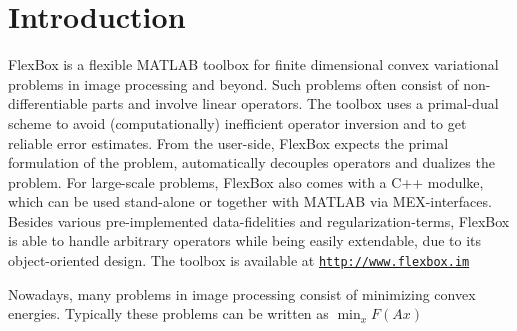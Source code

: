 \hypertarget{index_intro_sec}{}\section{Introduction}\label{index_intro_sec}
Flex\+Box is a flexible M\+A\+T\+L\+AB toolbox for finite dimensional convex variational problems in image processing and beyond. Such problems often consist of non-\/differentiable parts and involve linear operators. The toolbox uses a primal-\/dual scheme to avoid (computationally) inefficient operator inversion and to get reliable error estimates. From the user-\/side, Flex\+Box expects the primal formulation of the problem, automatically decouples operators and dualizes the problem. For large-\/scale problems, Flex\+Box also comes with a C++ modulke, which can be used stand-\/alone or together with M\+A\+T\+L\+AB via M\+E\+X-\/interfaces. Besides various pre-\/implemented data-\/fidelities and regularization-\/terms, Flex\+Box is able to handle arbitrary operators while being easily extendable, due to its object-\/oriented design. The toolbox is available at \href{http://www.flexbox.im}{\tt http\+://www.\+flexbox.\+im}

Nowadays, many problems in image processing consist of minimizing convex energies. Typically these problems can be written as $\min_{x} F(Ax)$ 